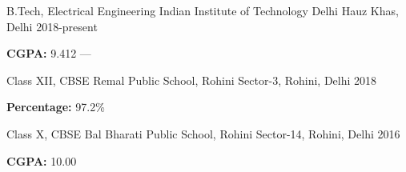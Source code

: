 
\begin{cventries}
  \cventry
    {B.Tech, Electrical Engineering} %
    {Indian Institute of Technology Delhi} %
    {Hauz Khas, Delhi} %
    {2018-present} %
    {
      \begin{cvitems} %
         \item {\textbf{CGPA: }9.412 --- }
      \end{cvitems}
    }

  \cventry
    {Class XII, CBSE}
    {Remal Public School, Rohini}
    {Sector-3, Rohini, Delhi}
    {2018}
    {
      \begin{cvitems}
        \item {\textbf{Percentage: }97.2\%}
      \end{cvitems}
    }

  \cventry
    {Class X, CBSE}
    {Bal Bharati Public School, Rohini}
    {Sector-14, Rohini, Delhi}
    {2016}
    {
      \begin{cvitems}
        \item {\textbf{CGPA: }10.00}
      \end{cvitems}
    }
\end{cventries}